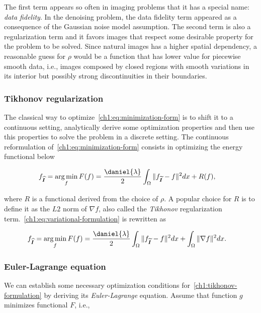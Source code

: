 The first term appears so often in imaging problems that it has a special name: \emph{data fidelity}. In the denoising problem, the data fidelity term appeared as a consequence of the Gaussian noise model assumption. The second term is also a regularization term and it favors images that respect some desirable property for the problem to be solved. Since natural images has a higher spatial dependency, a reasonable guess for $\rho$ would be a function that has lower value for piecewise smooth data, i.e., images composed by closed regions with smooth variations in its interior but possibly strong discontinuities in their boundaries. 


\subsubsection{Tikhonov regularization}
\label{ch1:subsec:tikhonov-regularization}
The classical way to optimize~\cref{ch1:eq:minimization-form} is to shift it to a continuous setting, analytically derive some optimization properties and then use this properties to solve the problem in a discrete setting. The continuous reformulation of~\cref{ch1:eq:minimization-form} consists in optimizing the energy functional below

\begin{align}
	f_{\vec{\widehat{I}}} &= \argmin_{f} F(f) = \frac{\daniel{ \lambda }}{2} \int_{\Omega}{ \norm{ f_{\vec{\widetilde{I}}} - f}^2dx} + R(f),
	\label{ch1:eq:variational-formulation}
\end{align}

where $R$ is a functional derived from the choice of $\rho$. A popular choice for $R$ is to define it as the $L2$ norm of $\nabla f$, also called the \emph{Tikhonov} regularization term.~\cref{ch1:eq:variational-formulation} is rewritten as

\begin{align}
	f_{\vec{\widehat{I}}} &= \argmin_{f} F(f) = \frac{\daniel{ \lambda }}{2} \int_{\Omega}{ \norm{ f_{\vec{\widetilde{I}}} - f}^2dx} + \int_{\Omega}{ \norm{ \nabla f }^2 dx }.
	\label{ch1:tikhonov-formulation}
\end{align}

\subsubsection{Euler-Lagrange equation}

We can establish some necessary optimization conditions for~\cref{ch1:tikhonov-formulation} by deriving its \emph{Euler-Lagrange} equation. Assume that function $g$ minimizes functional $F$, i.e.,

